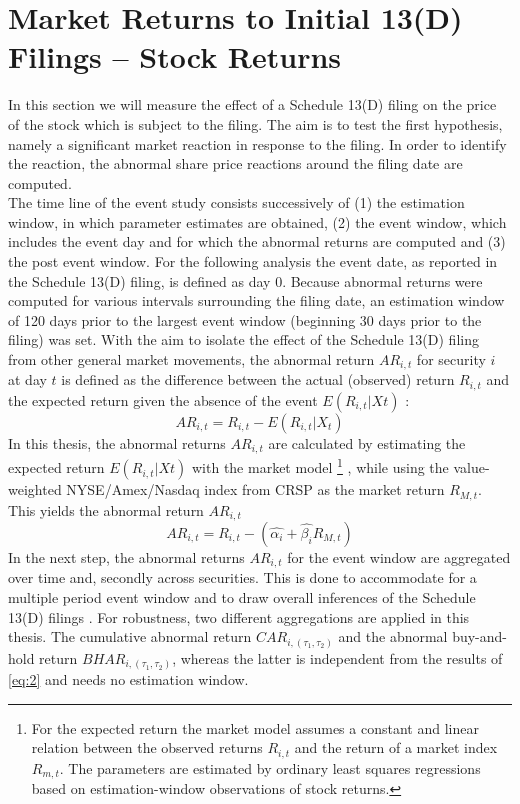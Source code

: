 \documentclass[12pt]{article}
\begin{document}
\section{Market Returns to Initial 13(D) Filings -- Stock Returns}
In this section we will measure the effect of a Schedule 13(D) filing on the price of the stock which is subject to the filing. The aim is to test the first hypothesis, namely a significant market reaction in response to the filing. In order to identify the reaction, the abnormal share price reactions around the filing date are computed.\\
The time line of the event study consists successively of (1) the estimation window, in which parameter estimates are obtained, (2) the event window, which includes the event day and for which the abnormal returns are computed and (3) the post event window. For the following analysis the event date, as reported in the Schedule 13(D) filing, is defined as day 0. Because abnormal returns were computed for various intervals surrounding the filing date, an estimation window of 120 days prior to the largest event window (beginning 30 days prior to the filing) was set.  
With the aim to isolate the effect of the Schedule 13(D) filing from other general market movements, the abnormal return $AR_{i,t}$ for security $i$ at day $t$ is defined as the difference between the actual (observed) return $R_{i,t}$ and the expected return given the absence of the event $E(R_{i,t}|X{t})$ :
	\begin{equation}\label{eq:1}
		AR_{i,t}=R_{i,t}-E(R_{i,t}|X_{t})
	\end{equation}
In this thesis, the abnormal returns $AR_{i,t}$ are calculated by estimating the expected return $E(R_{i,t}|X{t})$ with the market model 
	\footnote{For the expected return the market model assumes a constant and linear relation between the observed returns $R_{i,t}$ and the return of a market index $R_{m,t}$. The parameters are estimated by ordinary least squares regressions based on estimation-window observations of stock returns.} 
, while using the value-weighted NYSE/Amex/Nasdaq index from CRSP as the market return $R_{M,t}$.
This yields the abnormal return $AR_{i,t}$
\begin{equation}\label{eq:2}
	AR_{i,t}=R_{i,t}-(\hat{\alpha_{i}}+\hat{\beta_{i}}R_{M,t})
\end{equation}
In the next step, the abnormal returns $AR_{i,t}$ for the event window are aggregated over time and, secondly across securities. This is done to accommodate for a multiple period event window and to draw overall inferences of the Schedule 13(D) filings \citep{MacKinlay1997}.
For robustness, two different aggregations are applied in this thesis. The cumulative abnormal return $CAR_{i,(\tau_1,\tau_2)}$ and the abnormal buy-and-hold return $BHAR_{i,(\tau_1,\tau_2)}$, whereas the latter is independent from the results of \eqref{eq:2} and needs no estimation window.
\end{document}
